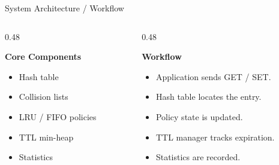 \documentclass[aspectratio=169,10pt]{beamer}
\begin{document}
\begin{frame}{System Architecture / Workflow}
\begin{columns}[T]
\begin{column}{0.48\textwidth}

\textbf{\color{GEUBlue}Core Components}

\begin{itemize}

\item Hash table
\item Collision lists
\item LRU / FIFO policies
\item TTL min-heap
\item Statistics

\end{itemize}

\end{column}

\begin{column}{0.48\textwidth}

\textbf{\color{GEUBlue}Workflow}

\begin{itemize}

\item Application sends GET / SET.
\item Hash table locates the entry.
\item Policy state is updated.
\item TTL manager tracks expiration.
\item Statistics are recorded.

\end{itemize}

\end{column}

\end{columns}

\end{frame}


\end{document}
